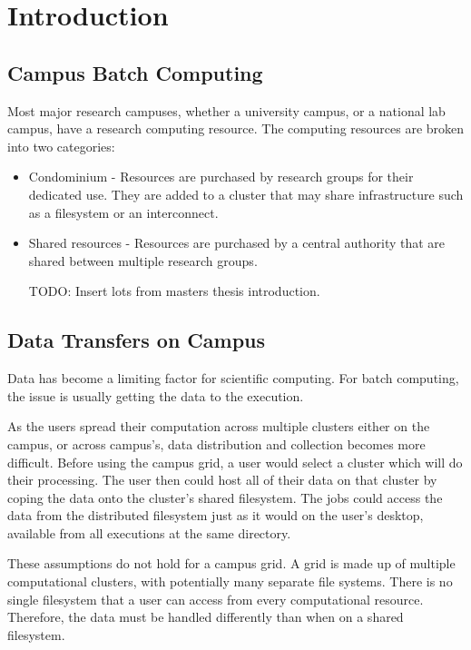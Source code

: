 \chapter{Introduction}

\section{Campus Batch Computing}

Most major research campuses, whether a university campus, or a national lab campus, have a research computing resource.  The computing resources are broken into two categories:

\begin{itemize}

\item Condominium - Resources are purchased by research groups for their dedicated use.  They are added to a cluster that may share infrastructure such as a filesystem or an interconnect.
\item Shared resources -  Resources are purchased by a central authority that are shared between multiple research groups.

TODO: Insert lots from masters thesis introduction.

\end{itemize}



\section{Data Transfers on Campus}

Data has become a limiting factor for scientific computing.  For batch computing, the issue is usually getting the data to the execution.  

As the users spread their computation across multiple clusters either on the campus, or across campus's, data distribution and collection becomes more difficult.  Before using the campus grid, a user would select a cluster which will do their processing.  The user then could host all of their data on that cluster by coping the data onto the cluster's shared filesystem.  The jobs could access the data from the distributed filesystem just as it would on the user's desktop, available from all executions at the same directory.


These assumptions do not hold for a campus grid.  A grid is made up of multiple computational clusters, with potentially many separate file systems.  There is no single filesystem that a user can access from every computational resource.  Therefore, the data must be handled differently than when on a shared filesystem.  

